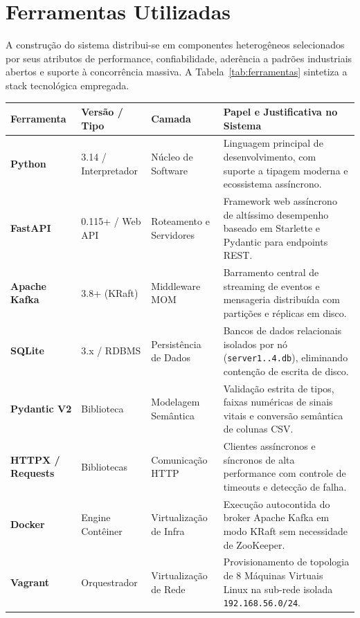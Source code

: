 \documentclass[12pt,a4paper]{article}
\begin{document}
\newpage

\section{Ferramentas Utilizadas}
\label{sec:ferramentas}

A construção do sistema distribui-se em componentes heterogêneos selecionados por seus atributos de performance, confiabilidade, aderência a padrões industriais abertos e suporte à concorrência massiva. A Tabela~\ref{tab:ferramentas} sintetiza a stack tecnológica empregada.

\begin{table}[H]
	\centering
	\small
	\begin{tabularx}{\textwidth}{p{3.2cm} p{2.4cm} p{3.2cm} X}
		\toprule
		\textbf{Ferramenta} & \textbf{Versão / Tipo} & \textbf{Camada} & \textbf{Papel e Justificativa no Sistema} \\
		\midrule
		\textbf{Python} & 3.14 / Interpretador & Núcleo de Software & Linguagem principal de desenvolvimento, com suporte a tipagem moderna e ecossistema assíncrono. \\
		\textbf{FastAPI} & 0.115+ / Web API & Roteamento e Servidores & Framework web assíncrono de altíssimo desempenho baseado em Starlette e Pydantic para endpoints REST. \\
		\textbf{Apache Kafka} & 3.8+ (KRaft) & Middleware MOM & Barramento central de streaming de eventos e mensageria distribuída com partições e réplicas em disco. \\
		\textbf{SQLite} & 3.x / RDBMS & Persistência de Dados & Bancos de dados relacionais isolados por nó (\texttt{server1..4.db}), eliminando contenção de escrita de disco. \\
		\textbf{Pydantic V2} & Biblioteca & Modelagem Semântica & Validação estrita de tipos, faixas numéricas de sinais vitais e conversão semântica de colunas CSV. \\
		\textbf{HTTPX / Requests} & Bibliotecas & Comunicação HTTP & Clientes assíncronos e síncronos de alta performance com controle de timeouts e detecção de falha. \\
		\textbf{Docker} & Engine Contêiner & Virtualização de Infra & Execução autocontida do broker Apache Kafka em modo KRaft sem necessidade de ZooKeeper. \\
		\textbf{Vagrant} & Orquestrador & Virtualização de Rede & Provisionamento de topologia de 8 Máquinas Virtuais Linux na sub-rede isolada \texttt{192.168.56.0/24}. \\

\end{tabularx}
\end{table}
\end{document}
